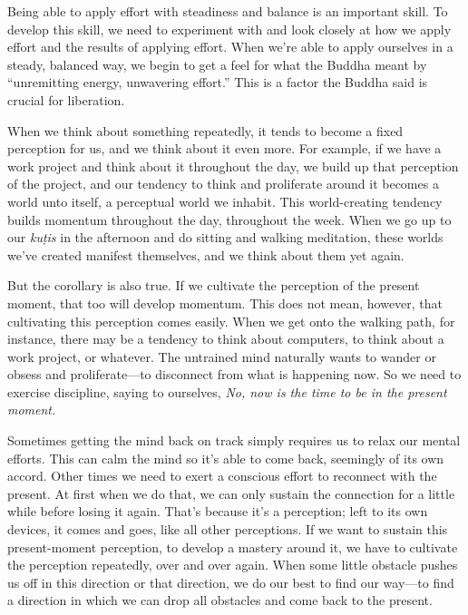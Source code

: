 Being able to apply effort with steadiness and balance is an important 
skill. To develop this skill, we need to experiment with and look 
closely at how we apply effort and the results of applying effort. When 
we're able to apply ourselves in a steady, balanced way, we begin to 
get a feel for what the Buddha meant by ``unremitting energy, 
unwavering effort.'' This is a factor the Buddha said is crucial for 
liberation.


When we think about something repeatedly, it tends to become a fixed 
perception for us, and we think about it even more. For example, if we 
have a work project and think about it throughout the day, we build up 
that perception of the project, and our tendency to think and 
proliferate around it becomes a world unto itself, a perceptual world 
we inhabit. This world-creating tendency builds momentum throughout the 
day, throughout the week. When we go up to our \emph{kuṭis} in the 
afternoon and do sitting and walking meditation, these worlds we've 
created manifest themselves, and we think about them yet again.

But the corollary is also true. If we cultivate the perception of the 
present moment, that too will develop momentum. This does not mean, 
however, that cultivating this perception comes easily. When we get 
onto the walking path, for instance, there may be a tendency to think 
about computers, to think about a work project, or whatever. The 
untrained mind naturally wants to wander or obsess and proliferate---to 
disconnect from what is happening now. So we need to exercise 
discipline, saying to ourselves, \emph{No, now is the time to be in the 
present moment.}

Sometimes getting the mind back on track simply requires us to relax 
our mental efforts. This can calm the mind so it's able to come back, 
seemingly of its own accord. Other times we need to exert a conscious 
effort to reconnect with the present. At first when we do that, we can 
only sustain the connection for a little while before losing it again. 
That's because it's a perception; left to its own devices, it comes and 
goes, like all other perceptions. If we want to sustain this 
present-moment perception, to develop a mastery around it, we have to 
cultivate the perception repeatedly, over and over again. When some 
little obstacle pushes us off in this direction or that direction, we 
do our best to find our way---to find a direction in which we can drop 
all obstacles and come back to the present.

